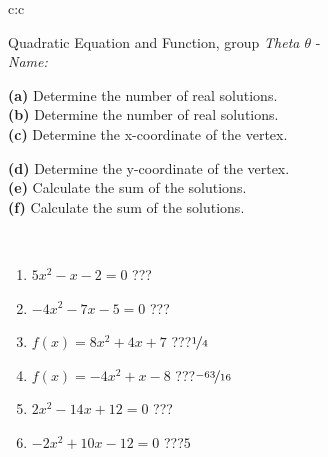 \documentclass[10pt]{report}
\begin{document}
\begin{tabular}{c:c}
\begin{minipage}[c][104.5mm][t]{0.5\linewidth}
\begin{center}
\vspace{7mm}
{\huge {\LARGE Quadratic Equation and Function}, group \textit{Theta $\theta$} -}\\[5mm]
\textit{Name:}\phantom{xxxxxxxxxxxxxxxxxxxxxxxxxxxxxxxxxxxxxxxxxxxxxxxxxxxxxxxxxxxxxxxxx}\\[5mm]
\begin{minipage}{0.95\linewidth}
\begin{center}
{\small \begin{minipage}{0.5\textwidth}
\textbf{(a)} Determine the number of real solutions. \\[1mm]
\textbf{(b)} Determine the number of real solutions. \\[1mm]
\textbf{(c)} Determine the x-coordinate of the vertex.
\end{minipage} \begin{minipage}{0.49\textwidth}
\textbf{(d)} Determine the y-coordinate of the vertex. \\[1mm]
\textbf{(e)} Calculate the sum of the solutions. \\[1mm]
\textbf{(f)} Calculate the sum of the solutions.
\end{minipage}
}
\end{center}
\end{minipage}
\\[4mm]
\begin{minipage}{0.79\linewidth}
\begin{center}
\begin{varwidth}{\linewidth}
\begin{enumerate}
\Large
\item $5x^2-x-2=0$\quad \dotfill\; ???\;\dotfill {}
\item $-4x^2-7x-5=0$\quad \dotfill\; ???\;\dotfill {}
\item $f(x)=8x^2+4x+7$\quad \dotfill\; ???\;\dotfill \quad $\nicefrac{1}{4}$
\item $f(x)=-4x^2+x-8$\quad \dotfill\; ???\;\dotfill \quad $\nicefrac{-63}{16}$
\item $2x^2-14x+12=0$\quad \dotfill\; ???\;\dotfill {}
\item $-2x^2+10x-12=0$\quad \dotfill\; ???\;\dotfill \quad $5$
\end{enumerate}
\end{varwidth}

\end{center}
\end{minipage}
\end{center}
\end{minipage}
\end{tabular}
\end{document}
